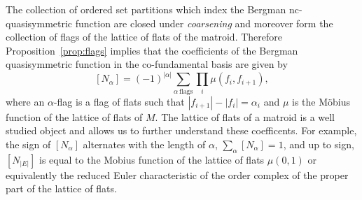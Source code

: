 \documentclass[12pt,reqno]{amsart}
\numberwithin{definition}{section}
\newtheorem{proposition}[definition]{Proposition}
\newtheorem{theorem}[definition]{Theorem}
\theoremstyle{definition}
\newcommand{\om}{\omega}
\begin{document}




The collection of ordered set partitions which index the Bergman
nc-quasisymmetric function are closed under {\em coarsening} and moreover form the collection of flags of the lattice of flats of the matroid. Therefore Proposition~\ref{prop:flags} implies that the coefficients of the Bergman quasisymmetric function in the co-fundamental basis are given by
$$[N_{\alpha}] = (-1)^{|\alpha|} \sum_{\alpha \, \textrm{flags}} \prod_i \mu(f_i,f_{i+1}),$$
where an $\alpha$-flag is a flag of flats such that $|f_{i+1}| - |f_i| = \alpha_i$ and $\mu$ is the M\"{o}bius function of the lattice of flats of $M$.  The lattice of flats of a matroid is a well studied object and allows us to further understand these coefficents.  For example, the sign of $[N_{\alpha}]$ alternates with the length of $\alpha$,  $\sum_{\alpha} [N_{\alpha}] = 1$, and up to sign, $ [N_{|E|}]$ is equal to the Mobius function of the lattice
of flats $\mu(0,1)$ or equivalently the reduced Euler characteristic of the order complex of the
proper part of the lattice of flats.


\end{document}
